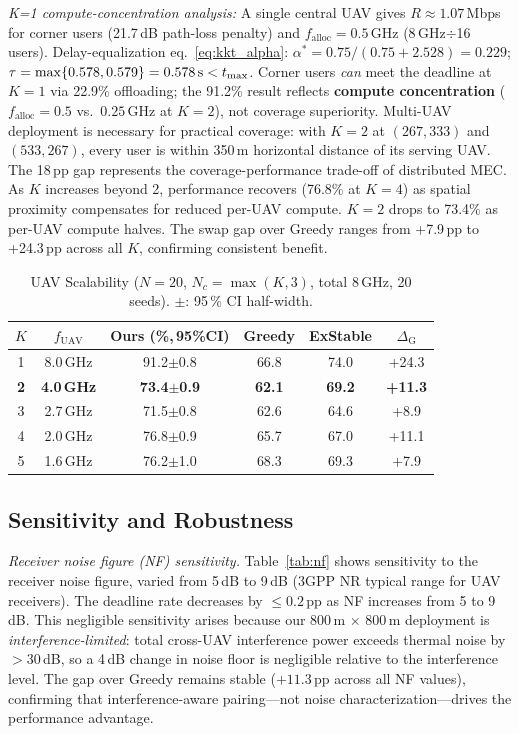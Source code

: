 \documentclass[journal]{IEEEtran}
\begin{document}
\emph{K=1 compute-concentration analysis:}
A single central UAV gives $R \approx 1.07$\,Mbps for corner users (21.7\,dB path-loss penalty) and $f_{\text{alloc}}=0.5$\,GHz (8\,GHz$\div$16 users).
Delay-equalization eq.~\eqref{eq:kkt_alpha}: $\alpha^* = 0.75/(0.75 + 2.528) = 0.229$; $\tau = \max\{0.578, 0.579\} = 0.578\text{\,s} < t_{\max}$.
Corner users \emph{can} meet the deadline at $K=1$ via 22.9\% offloading; the 91.2\% result reflects \textbf{compute concentration} ($f_{\text{alloc}}=0.5$ vs.\ $0.25$\,GHz at $K=2$), not coverage superiority.
Multi-UAV deployment is necessary for practical coverage: with $K=2$ at $(267, 333)$ and $(533, 267)$, every user is within 350\,m horizontal distance of its serving UAV.
The 18\,pp gap represents the coverage-performance trade-off of distributed MEC.
As $K$ increases beyond 2, performance recovers (76.8\% at $K=4$) as spatial proximity compensates for reduced per-UAV compute.
$K=2$ drops to 73.4\% as per-UAV compute halves.
The swap gap over Greedy ranges from +7.9\,pp to +24.3\,pp across all $K$, confirming consistent benefit.

\begin{table}[t]
\centering
\caption{UAV Scalability ($N\!=\!20$, $N_c\!=\!\max(K,3)$, total 8\,GHz, 20 seeds). $\pm$: 95\,\% CI half-width.}
\label{tab:k_scalability}
\footnotesize
\begin{tabular}{cccccc}
\toprule
$K$ & $f_{\text{UAV}}$ & Ours (\%,\,95\%CI) & Greedy & ExStable & $\Delta_{\text{G}}$ \\
\midrule
1 & 8.0\,GHz & 91.2$\pm$0.8 & 66.8 & 74.0 & +24.3 \\
\textbf{2} & \textbf{4.0\,GHz} & \textbf{73.4$\pm$0.9} & \textbf{62.1} & \textbf{69.2} & \textbf{+11.3} \\
3 & 2.7\,GHz & 71.5$\pm$0.8 & 62.6 & 64.6 & +8.9 \\
4 & 2.0\,GHz & 76.8$\pm$0.9 & 65.7 & 67.0 & +11.1 \\
5 & 1.6\,GHz & 76.2$\pm$1.0 & 68.3 & 69.3 & +7.9 \\
\bottomrule
\end{tabular}
\end{table}

\subsection{Sensitivity and Robustness}

\emph{Receiver noise figure (NF) sensitivity.}
Table~\ref{tab:nf} shows sensitivity to the receiver noise figure, varied from 5\,dB to 9\,dB (3GPP NR typical range for UAV receivers).
The deadline rate decreases by $\leq 0.2$\,pp as NF increases from 5 to 9\,dB.
This negligible sensitivity arises because our 800\,m $\times$ 800\,m deployment is \emph{interference-limited}: total cross-UAV interference power exceeds thermal noise by $>$30\,dB, so a 4\,dB change in noise floor is negligible relative to the interference level.
The gap over Greedy remains stable ($+11.3$\,pp across all NF values), confirming that interference-aware pairing---not noise characterization---drives the performance advantage.
\end{document}
